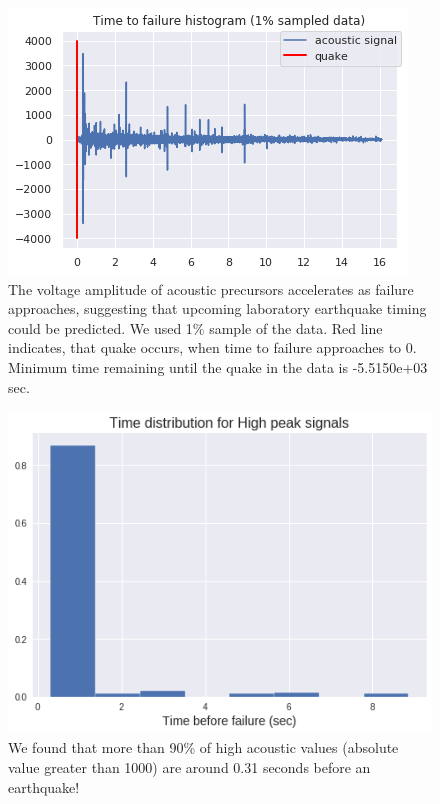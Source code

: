 \documentclass[]{llncs} %
\begin{document}
\begin{figure}
	\centering
	\includegraphics[width=.9\linewidth]{timeToFailureHistogram}
	\caption{The voltage amplitude of acoustic precursors accelerates as failure approaches, suggesting that upcoming laboratory earthquake timing could be predicted. We used 1\% sample of the data. Red line indicates, that quake occurs, when time to failure approaches to 0. Minimum time remaining until the quake in the data is  -5.5150e+03 sec.}
	\label{fig:timeToFailureHistogram}
\end{figure}
\begin{figure}
	\centering
	\includegraphics[width=.9\linewidth]{timeDistribution}
	\caption{We found that more than 90\% of high acoustic values (absolute value greater than 1000) are around 0.31 seconds before an earthquake!}
	\label{fig:timeDistribution}
\end{figure}
\end{document}
